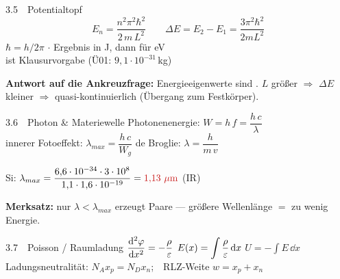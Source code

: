 \begin{RezeptB}{3.5\ \ Potentialtopf \hfill {}}
\[ E_n=\frac{n^{2}\pi^{2}\hbar^{2}}{2\,m\,L^{2}}\qquad
   \Delta E=E_2-E_1=\frac{3\pi^{2}\hbar^{2}}{2mL^{2}} \]
$\hbar=h/2\pi$ $\cdot$ Ergebnis in J, dann
 für eV\\
 ist Klausurvorgabe (Ü01: $9{,}1\cdot10^{-31}$\,kg)
\vspace{0.4mm}

\textbf{Antwort auf die Ankreuzfrage:} Energieeigenwerte sind
. $L$ größer $\Rightarrow$ $\Delta E$ kleiner
$\Rightarrow$ quasi-kontinuierlich (Übergang zum Festkörper).
\end{RezeptB}

\begin{RezeptB}{3.6\ \ Photon \& Materiewelle \hfill {}}
Photonenenergie: $W=h\,f=\dfrac{h\,c}{\lambda}$\\
innerer Fotoeffekt: $\lambda_{max}=\dfrac{h\,c}{W_g}$\qquad
de Broglie: $\lambda=\dfrac{h}{m\,v}$
\vspace{0.3mm}

Si: $\lambda_{max}=\dfrac{6{,}6\cdot10^{-34}\cdot3\cdot10^{8}}
{1{,}1\cdot1{,}6\cdot10^{-19}}=\erg{1{,}13\ \mu\mathrm{m}}$ (IR)
\vspace{0.3mm}

\textbf{Merksatz:} nur $\lambda<\lambda_{max}$ erzeugt Paare —
größere Wellenlänge $=$ zu wenig Energie.
\end{RezeptB}

\begin{RezeptC}{3.7\ \ Poisson / Raumladung \hfill {}}
$\dfrac{\mathrm{d}^{2}\varphi}{\mathrm{d} x^{2}}=-\dfrac{\rho}{\varepsilon}$ \quad
$E(x)=\displaystyle\int\frac{\rho}{\varepsilon}\,\mathrm{d} x$ \quad
$U=-\displaystyle\int E\,\dd x$\\
Ladungsneutralität: $N_A x_p=N_D x_n$;\ \ RLZ-Weite
$w=x_p+x_n$
\end{RezeptC}


